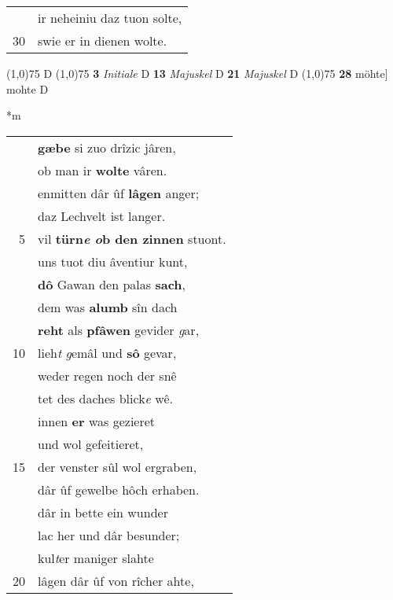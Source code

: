 \documentclass[8pt,a4paper,notitlepage]{article}
\begin{document}
\begin{table}[ht]
\begin{minipage}[t]{0.5\linewidth}
\begin{tabular}{rl}
 & ir neheiniu daz tuon solte,\\ 
30 & swie er in dienen wolte.\\ 
\end{tabular}
\scriptsize
\line(1,0){75} \newline
D \newline
\line(1,0){75} \newline
\textbf{3} \textit{Initiale} D  \textbf{13} \textit{Majuskel} D  \textbf{21} \textit{Majuskel} D  \newline
\line(1,0){75} \newline
\textbf{28} möhte] mohte D \newline
\end{minipage}
\hspace{0.5cm}
\begin{minipage}[t]{0.5\linewidth}
\small
\begin{center}*m
\end{center}
\begin{tabular}{rl}
 & \textbf{gæbe} si zuo drîzic jâren,\\ 
 & ob man ir \textbf{wolte} vâren.\\ 
 & enmitten dâr ûf \textbf{lâgen} anger;\\ 
 & daz Lechvelt ist langer.\\ 
5 & vil \textbf{türn\textit{e} \textit{o}b den zinnen} stuont.\\ 
 & uns tuot diu âventiur kunt,\\ 
 & \textbf{dô} Gawan den palas \textbf{sach},\\ 
 & dem was \textbf{alumb} sîn dach\\ 
 & \textbf{reht} als \textbf{pfâwen} gevider \textit{g}ar,\\ 
10 & lieh\textit{t} \textit{g}emâl und \textbf{sô} gevar,\\ 
 & weder regen noch der snê\\ 
 & tet des daches blick\textit{e} wê.\\ 
 & innen \textbf{er} was gezieret\\ 
 & und wol gefeitieret,\\ 
15 & der venster sûl wol ergraben,\\ 
 & dâr ûf gewelbe hôch erhaben.\\ 
 & dâr in bette ein wunder\\ 
 & lac her und dâr besunder;\\ 
 & kul\textit{t}er maniger slahte\\ 
20 & lâgen dâr ûf von rîcher ahte,\\ 

\end{tabular}
\end{minipage}
\end{table}
\end{document}

